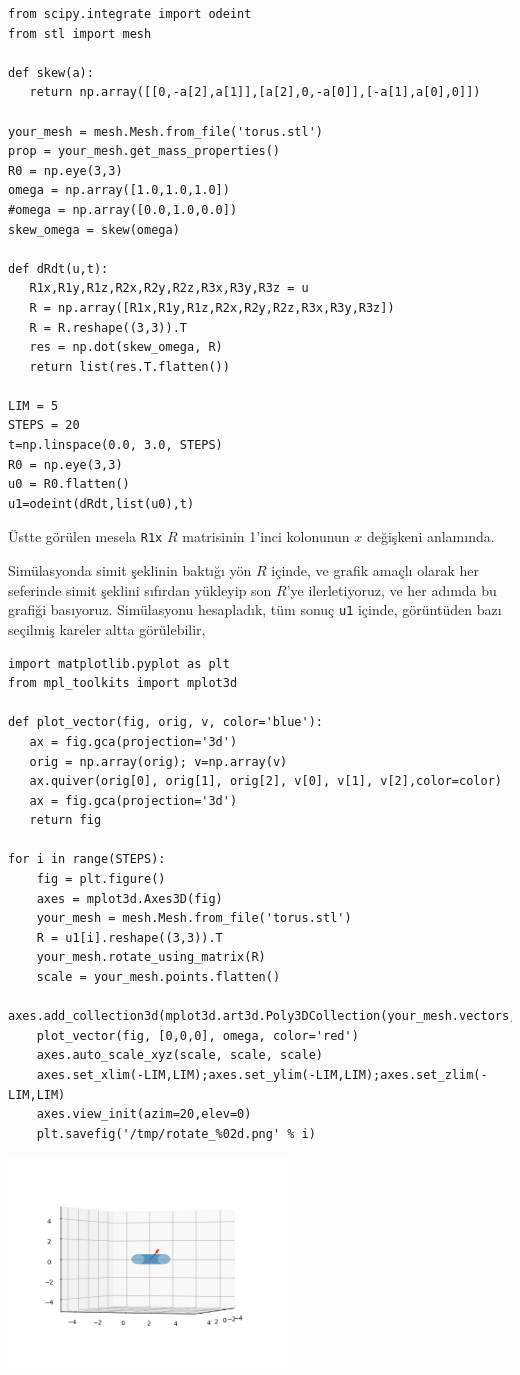 \documentclass[12pt,fleqn]{article}\usepackage{../../common}
\begin{document}
\begin{verbatim}
from scipy.integrate import odeint
from stl import mesh

def skew(a):
   return np.array([[0,-a[2],a[1]],[a[2],0,-a[0]],[-a[1],a[0],0]])

your_mesh = mesh.Mesh.from_file('torus.stl')
prop = your_mesh.get_mass_properties()
R0 = np.eye(3,3)
omega = np.array([1.0,1.0,1.0])
#omega = np.array([0.0,1.0,0.0])
skew_omega = skew(omega)
   
def dRdt(u,t):   
   R1x,R1y,R1z,R2x,R2y,R2z,R3x,R3y,R3z = u
   R = np.array([R1x,R1y,R1z,R2x,R2y,R2z,R3x,R3y,R3z])
   R = R.reshape((3,3)).T
   res = np.dot(skew_omega, R)
   return list(res.T.flatten())

LIM = 5
STEPS = 20
t=np.linspace(0.0, 3.0, STEPS)
R0 = np.eye(3,3)
u0 = R0.flatten()
u1=odeint(dRdt,list(u0),t)
\end{verbatim}

Üstte görülen mesela \verb!R1x! $R$ matrisinin 1'inci kolonunun $x$ değişkeni
anlamında.

Simülasyonda simit şeklinin baktığı yön $R$ içinde, ve grafik amaçlı olarak her
seferinde simit şeklini sıfırdan yükleyip son $R$'ye ilerletiyoruz, ve her
adımda bu grafiği basıyoruz.  Simülasyonu hesapladık, tüm sonuç \verb!u1!
içinde, görüntüden bazı seçilmiş kareler altta görülebilir,

\begin{verbatim}
import matplotlib.pyplot as plt
from mpl_toolkits import mplot3d

def plot_vector(fig, orig, v, color='blue'):
   ax = fig.gca(projection='3d')
   orig = np.array(orig); v=np.array(v)
   ax.quiver(orig[0], orig[1], orig[2], v[0], v[1], v[2],color=color)
   ax = fig.gca(projection='3d')  
   return fig

for i in range(STEPS):
    fig = plt.figure()
    axes = mplot3d.Axes3D(fig)
    your_mesh = mesh.Mesh.from_file('torus.stl')
    R = u1[i].reshape((3,3)).T
    your_mesh.rotate_using_matrix(R)
    scale = your_mesh.points.flatten()
    axes.add_collection3d(mplot3d.art3d.Poly3DCollection(your_mesh.vectors,alpha=0.3))
    plot_vector(fig, [0,0,0], omega, color='red')
    axes.auto_scale_xyz(scale, scale, scale)
    axes.set_xlim(-LIM,LIM);axes.set_ylim(-LIM,LIM);axes.set_zlim(-LIM,LIM)
    axes.view_init(azim=20,elev=0)
    plt.savefig('/tmp/rotate_%02d.png' % i)  
\end{verbatim}

\includegraphics[width=20em]{sim1/rotate_00.png}
\end{document}
